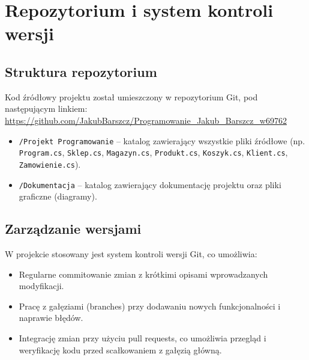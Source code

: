 \chapter{Repozytorium i system kontroli wersji}
\section{Struktura repozytorium}
Kod źródłowy projektu został umieszczony w repozytorium Git, pod następującym linkiem:
\url{https://github.com/JakubBarszcz/Programowanie_Jakub_Barszcz_w69762}

\begin{itemize}
    \item \texttt{/Projekt Programowanie} – katalog zawierający wszystkie pliki źródłowe (np. \texttt{Program.cs}, \texttt{Sklep.cs}, \texttt{Magazyn.cs}, \texttt{Produkt.cs}, \texttt{Koszyk.cs}, \texttt{Klient.cs}, \texttt{Zamowienie.cs}).
    \item \texttt{/Dokumentacja} – katalog zawierający dokumentację projektu oraz pliki graficzne (diagramy).
\end{itemize}

\section{Zarządzanie wersjami}
W projekcie stosowany jest system kontroli wersji Git, co umożliwia:
\begin{itemize}
    \item Regularne commitowanie zmian z krótkimi opisami wprowadzanych modyfikacji.
    \item Pracę z gałęziami (branches) przy dodawaniu nowych funkcjonalności i naprawie błędów.
    \item Integrację zmian przy użyciu pull requests, co umożliwia przegląd i weryfikację kodu przed scałkowaniem z gałęzią główną.
\end{itemize}
